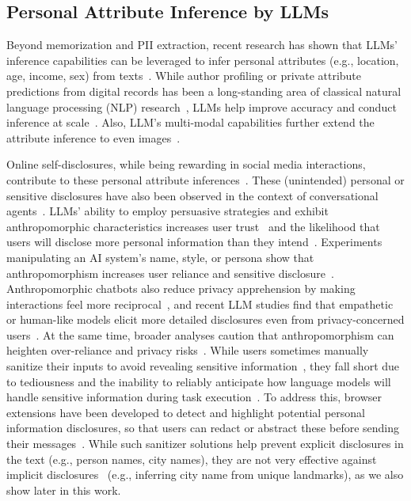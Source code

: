 \subsection{Personal Attribute Inference by LLMs}
\label{sec:rel_attribute_inference}
Beyond memorization and PII extraction, recent research has shown that LLMs' inference capabilities can be leveraged to infer personal attributes (e.g., location, age, income, sex) from texts~\cite{staab2024beyond}. While author profiling or private attribute predictions from digital records has been a long-standing area of classical natural language processing (NLP) research~\cite{estival2007author, kosinski2013private}, LLMs help improve accuracy and conduct inference at scale~\cite{weidinger2021ethical, brewster2023chatgpt}. Also, LLM's multi-modal capabilities further extend the attribute inference to even images~\cite{tomekcce2024private}.

Online self-disclosures, while being rewarding in social media interactions, contribute to these personal attribute inferences~\cite{dou-etal-2024-reducing}. These (unintended) personal or sensitive disclosures have also been observed in the context of conversational agents~\cite{mireshghallah2024trust,zhang2024s}. LLMs' ability to employ persuasive strategies and exhibit anthropomorphic characteristics increases user trust~\cite{cohn2024believing} and the likelihood that users will disclose more personal information than they intend~\cite{ischen2019privacy,stock2023tell, zhan2025malicious}. Experiments manipulating an AI system’s name, style, or persona show that anthropomorphism increases user reliance and sensitive disclosure~\cite{bi2023create}. Anthropomorphic chatbots also reduce privacy apprehension by making interactions feel more reciprocal~\cite{shim2024unveiling, jo2024understanding}, and recent LLM studies find that empathetic or human-like models elicit more detailed disclosures even from privacy-concerned users~\cite{choi2025privacy}. At the same time, broader analyses caution that anthropomorphism can heighten over-reliance and privacy risks~\cite{peter2025benefits}. While users sometimes manually sanitize their inputs to avoid revealing sensitive information~\cite{zhang2024s}, they fall short due to tediousness and the inability to reliably anticipate how language models will handle sensitive information during task execution~\cite{shao2024privacylens}. To address this, browser extensions have been developed to detect and highlight potential personal information disclosures, so that users can redact or abstract these before sending their messages~\cite{rescriber, chen2025clear}. While such sanitizer solutions help prevent explicit disclosures in the text (e.g., person names, city names), they are not very effective against implicit disclosures~\cite{synthpai} (e.g., inferring city name from unique landmarks), as we also show later in this work.

